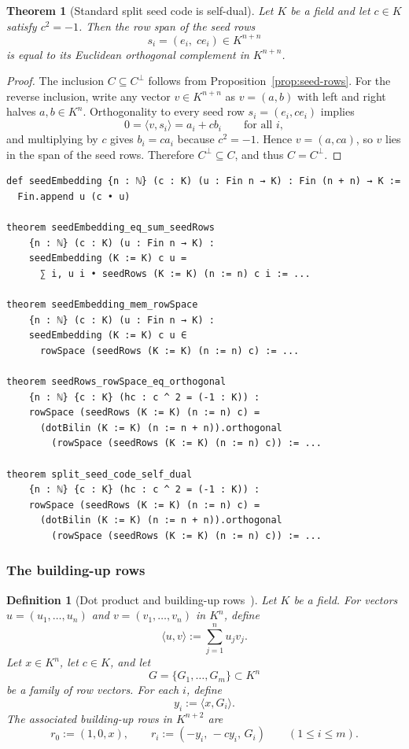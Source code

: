\documentclass[12pt]{article}
\newtheorem{defn}{Definition}[section]
\newtheorem{theorem}{Theorem}[section]
\begin{document}
\begin{theorem}[Standard split seed code is self-dual]
\label{thm:split-seed-self-dual}
Let $K$ be a field and let $c\in K$ satisfy $c^2=-1$. Then the row span of the seed rows
\[
s_i=(e_i,\; c e_i)\in K^{n+n}
\]
is equal to its Euclidean orthogonal complement in $K^{n+n}$.
\end{theorem}

\begin{proof}
The inclusion $C\subseteq C^\perp$ follows from Proposition~\ref{prop:seed-rows}. For the reverse inclusion, write any vector $v\in K^{n+n}$ as $v=(a,b)$ with left and right halves $a,b\in K^n$. Orthogonality to every seed row $s_i=(e_i,ce_i)$ implies
\[
0=\langle v,s_i\rangle = a_i + c b_i
\qquad\text{for all }i,
\]
and multiplying by $c$ gives $b_i = c a_i$ because $c^2=-1$. Hence $v=(a,ca)$, so $v$ lies in the span of the seed rows. Therefore $C^\perp\subseteq C$, and thus $C=C^\perp$.
\end{proof}

\begin{lstlisting}[caption={Lean verification for Theorem~\ref{thm:split-seed-self-dual}.}]
def seedEmbedding {n : ℕ} (c : K) (u : Fin n → K) : Fin (n + n) → K :=
  Fin.append u (c • u)

theorem seedEmbedding_eq_sum_seedRows
    {n : ℕ} (c : K) (u : Fin n → K) :
    seedEmbedding (K := K) c u =
      ∑ i, u i • seedRows (K := K) (n := n) c i := ...

theorem seedEmbedding_mem_rowSpace
    {n : ℕ} (c : K) (u : Fin n → K) :
    seedEmbedding (K := K) c u ∈
      rowSpace (seedRows (K := K) (n := n) c) := ...

theorem seedRows_rowSpace_eq_orthogonal
    {n : ℕ} {c : K} (hc : c ^ 2 = (-1 : K)) :
    rowSpace (seedRows (K := K) (n := n) c) =
      (dotBilin (K := K) (n := n + n)).orthogonal
        (rowSpace (seedRows (K := K) (n := n) c)) := ...

theorem split_seed_code_self_dual
    {n : ℕ} {c : K} (hc : c ^ 2 = (-1 : K)) :
    rowSpace (seedRows (K := K) (n := n) c) =
      (dotBilin (K := K) (n := n + n)).orthogonal
        (rowSpace (seedRows (K := K) (n := n) c)) := ...
\end{lstlisting}

\subsubsection{The building-up rows}

\begin{defn}[Dot product and building-up rows~\cite{Kim2001}]
\label{def:buildrows}
Let $K$ be a field. For vectors $u=(u_1,\dots,u_n)$ and $v=(v_1,\dots,v_n)$ in $K^n$, define
\[
\langle u,v\rangle := \sum_{j=1}^n u_j v_j.
\]
Let $x\in K^n$, let $c\in K$, and let
\[
G=\{G_1,\dots,G_m\}\subset K^n
\]
be a family of row vectors. For each $i$, define
\[
y_i := \langle x,G_i\rangle.
\]
The associated building-up rows in $K^{n+2}$ are
\[
r_0 := (1,0,x),
\qquad
r_i := (-y_i,\,-c y_i,\,G_i)
\qquad (1\le i\le m).
\]
\end{defn}
\end{document}
